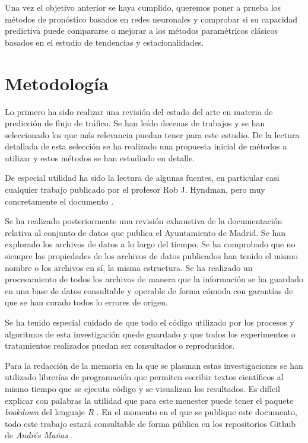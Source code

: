 \documentclass[]{book}
\begin{document}
Una vez el objetivo anterior se haya cumplido, queremos poner a prueba
los métodos de pronóstico basados en redes neuronales y comprobar si su
capacidad predictiva puede compararse o mejorar a los métodos
paramétricos clásicos basados en el estudio de tendencias y
estacionalidades.

\section{Metodología}\label{metodologia}

Lo primero ha sido realizar una revisión del estado del arte en materia
de predicción de flujo de tráfico. Se han leído decenas de trabajos y se
han seleccionado los que más relevancia puedan tener para este estudio.
De la lectura detallada de esta selección se ha realizado una propuesta
inicial de métodos a utilizar y estos métodos se han estudiado en
detalle.

De especial utilidad ha sido la lectura de algunas fuentes, en
particular casi cualquier trabajo publicado por el profesor Rob J.
Hyndman, pero muy concretamente el documento \citep{Forecast6-online}.

Se ha realizado posteriormente una revisión exhaustiva de la
documentación relativa al conjunto de datos que publica el Ayuntamiento
de Madrid. Se han explorado los archivos de datos a lo largo del tiempo.
Se ha comprobado que no siempre las propiedades de los archivos de datos
publicados han tenido el mismo nombre o los archivos en sí, la misma
estructura. Se ha realizado un procesamiento de todos los archivos de
manera que la información se ha guardado en una base de datos
consultable y operable de forma cómoda con garantías de que se han
curado todos lo errores de origen.

Se ha tenido especial cuidado de que todo el código utilizado por los
procesos y algoritmos de esta investigación quede guardado y que todos
los experimentos o tratamientos realizados puedan ser consultados o
reproducidos.

Para la redacción de la memoria en la que se plasman estas
investigaciones se han utilizado librerías de programación que permiten
escribir textos científicos al mismo tiempo que se ejecuta código y se
visualizan los resultados. Es difícil explicar con palabras la utilidad
que para este menester puede tener el paquete \emph{bookdown}
\citep{R-bookdown} del lenguaje \emph{R} \citep{R-base}. En el momento
en el que se publique este documento, todo este trabajo estará
consultable de forma pública en los repositorios Github de \emph{Andrés
Mañas} \citep{amanas-github}.
\end{document}
